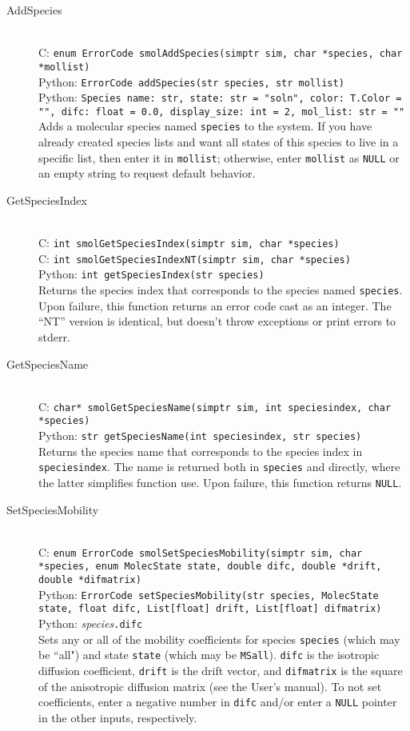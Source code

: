 \documentclass {book}
\newcommand {\ttt} {\texttt}
\begin{document}
\begin{description}

\item[AddSpecies]
\hfill \\
C: \ttt{enum ErrorCode smolAddSpecies(simptr sim, char *species, char *mollist)}\\
Python: \ttt{ErrorCode addSpecies(str species, str mollist)}\\
Python: \ttt{Species name: str, state: str = "soln", color: T.Color = "", difc: float = 0.0, display\_size: int = 2, mol\_list: str = ""}\\
Adds a molecular species named \ttt{species} to the system. If you have already created species lists and want all states of this species to live in a specific list, then enter it in \ttt{mollist}; otherwise, enter \ttt{mollist} as \ttt{NULL} or an empty string to request default behavior.

\item[GetSpeciesIndex]
\hfill \\
C: \ttt{int smolGetSpeciesIndex(simptr sim, char *species)}\\
C: \ttt{int smolGetSpeciesIndexNT(simptr sim, char *species)}\\
Python: \ttt{int getSpeciesIndex(str species)}\\
Returns the species index that corresponds to the species named \ttt{species}. Upon failure, this function returns an error code cast as an integer. The ``NT'' version is identical, but doesn't throw exceptions or print errors to stderr.

\item[GetSpeciesName]
\hfill \\
C: \ttt{char* smolGetSpeciesName(simptr sim, int speciesindex, char *species)}\\
Python: \ttt{str getSpeciesName(int speciesindex, str species)}\\
Returns the species name that corresponds to the species index in \ttt{speciesindex}. The name is returned both in \ttt{species} and directly, where the latter simplifies function use. Upon failure, this function returns \ttt{NULL}.

\item[SetSpeciesMobility]
\hfill \\
C: \ttt{enum ErrorCode smolSetSpeciesMobility(simptr sim, char *species, enum MolecState state, double difc, double *drift, double *difmatrix)}\\
Python: \ttt{ErrorCode setSpeciesMobility(str species, MolecState state, float difc, List[float] drift, List[float] difmatrix)}\\
Python: \textit{species}\ttt{.difc}\\
Sets any or all of the mobility coefficients for species \ttt{species} (which may be ``all") and state \ttt{state} (which may be \ttt{MSall}). \ttt{difc} is the isotropic diffusion coefficient, \ttt{drift} is the drift vector, and \ttt{difmatrix} is the square of the anisotropic diffusion matrix (see the User's manual). To not set coefficients, enter a negative number in \ttt{difc} and/or enter a \ttt{NULL} pointer in the other inputs, respectively.


\end{description}
\end{document}
